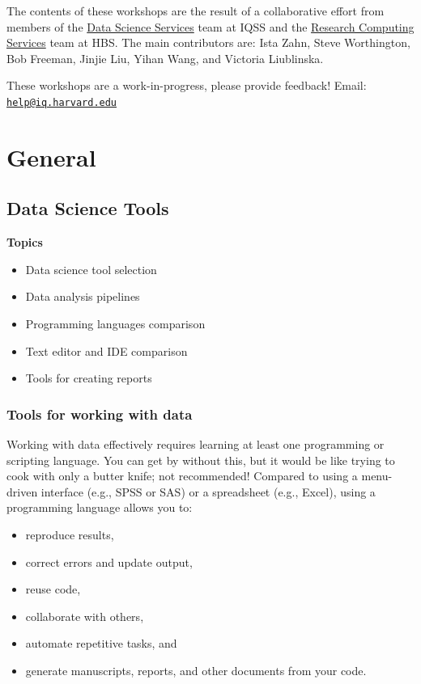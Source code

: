\documentclass[
]{book}
\providecommand{\tightlist}{%
  \setlength{\itemsep}{0pt}\setlength{\parskip}{0pt}}
\begin{document}
The contents of these workshops are the result of a collaborative effort from members of the \href{http://dss.iq.harvard.edu}{Data Science Services} team at IQSS and the \href{https://training.rcs.hbs.org}{Research Computing Services} team at HBS. The main contributors are: Ista Zahn, Steve Worthington, Bob Freeman, Jinjie Liu, Yihan Wang, and Victoria Liublinska.

These workshops are a work-in-progress, please provide feedback! Email: \href{mailto:help@iq.harvard.edu}{\nolinkurl{help@iq.harvard.edu}}

\hypertarget{part-general}{%
\part{General}\label{part-general}}

\hypertarget{data-science-tools}{%
\chapter{Data Science Tools}\label{data-science-tools}}

\textbf{Topics}

\begin{itemize}
\tightlist
\item
  Data science tool selection
\item
  Data analysis pipelines
\item
  Programming languages comparison
\item
  Text editor and IDE comparison
\item
  Tools for creating reports
\end{itemize}

\hypertarget{tools-for-working-with-data}{%
\section{Tools for working with data}\label{tools-for-working-with-data}}

Working with data effectively requires learning at least one programming or scripting language. You can get by without this, but it would be like trying to cook with only a butter knife; not recommended! Compared to using a menu-driven interface (e.g., SPSS or SAS) or a spreadsheet (e.g., Excel), using a programming language allows you to:

\begin{itemize}
\tightlist
\item
  reproduce results,
\item
  correct errors and update output,
\item
  reuse code,
\item
  collaborate with others,
\item
  automate repetitive tasks, and
\item
  generate manuscripts, reports, and other documents from your code.
\end{itemize}
\end{document}
